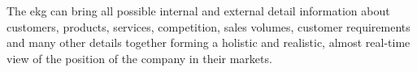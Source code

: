%
%
The \gls{ekg} can bring all possible internal and external detail information about customers, products, services,
competition, sales volumes, customer requirements and many other details together forming a holistic and realistic,
almost real-time view of the position of the company in their markets.
